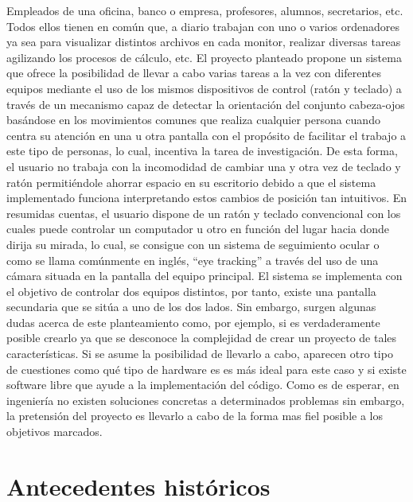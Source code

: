Empleados de una oficina, banco o empresa, profesores, alumnos, secretarios, etc. Todos ellos tienen en común que, a diario trabajan con uno o varios ordenadores ya sea para visualizar distintos archivos en cada monitor, realizar diversas tareas agilizando los procesos de cálculo, etc. El proyecto planteado propone un sistema que ofrece la posibilidad de llevar a cabo varias tareas a la vez con diferentes equipos mediante el uso de los mismos dispositivos de control (ratón y teclado) a través de un mecanismo capaz de detectar la orientación del conjunto cabeza-ojos basándose en los movimientos comunes que realiza cualquier persona cuando centra su atención en una u otra pantalla con el propósito de facilitar el trabajo a este tipo de personas, lo cual, incentiva la tarea de investigación. De esta forma, el usuario no trabaja con la incomodidad  de cambiar una y otra vez de teclado y ratón permitiéndole ahorrar espacio en su escritorio debido a que el sistema implementado funciona interpretando estos cambios de posición tan intuitivos. En resumidas cuentas, el usuario dispone de un ratón y teclado convencional con los cuales puede controlar un computador u otro en función del lugar hacia donde dirija su mirada, lo cual, se consigue con un sistema de seguimiento ocular o como se llama comúnmente en inglés, ``eye tracking'' a través del uso de una cámara situada en la pantalla del equipo principal. El sistema se implementa con el objetivo de controlar dos equipos distintos, por tanto, existe una pantalla secundaria que se sitúa a uno de los dos lados. Sin embargo, surgen algunas dudas acerca de este planteamiento como, por ejemplo, si es verdaderamente posible crearlo ya que se desconoce la complejidad de crear un proyecto de tales características. Si se asume la posibilidad de llevarlo a cabo, aparecen otro tipo de cuestiones como qué tipo de hardware es es más ideal para este caso y si existe software libre que ayude a la implementación del código. Como es de esperar, en ingeniería no existen soluciones concretas a determinados problemas sin embargo, la pretensión del proyecto es llevarlo a cabo de la forma mas fiel posible a los objetivos marcados.


\section{Antecedentes históricos} \label{s1_2}

